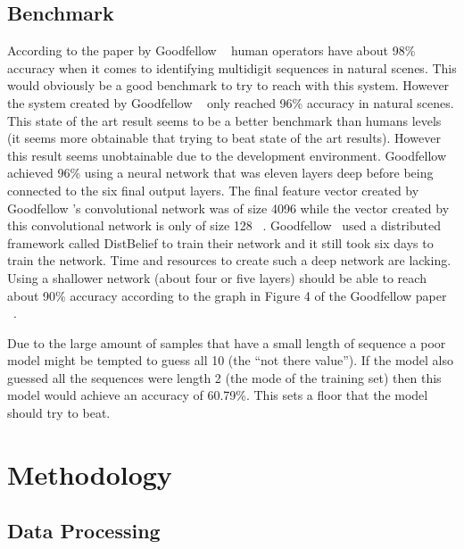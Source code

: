\documentclass[12pt,twocolumn,letterpaper]{article}
\begin{document}
\subsection{Benchmark}
According to the paper by Goodfellow \etal ~\cite{goodfellow} human operators have about 98\% 
accuracy when it comes to identifying multidigit sequences in natural scenes. 
This would obviously be a good benchmark to try to reach with this system. 
However the system created by Goodfellow \etal ~\cite{goodfellow} only reached 96\% accuracy in natural scenes. 
This state of the art result seems to be a better benchmark than humans levels 
(it seems more obtainable that trying to beat state of the art results). However
this result seems unobtainable due to the development environment. Goodfellow 
\etal ~\cite{goodfellow} achieved 96\% using a neural network that was eleven layers deep before 
being connected to the six final output layers. The final feature vector created by
Goodfellow \etal's convolutional network was of size 4096 while the vector created 
by this convolutional network is only of size 128 ~\cite{goodfellow}. Goodfellow \etal ~\cite{goodfellow}used a 
distributed framework called DistBelief to train their network and it still took 
six days to train the network. Time and resources to create such a deep network 
are lacking. Using a shallower network (about four or five layers) should be able to
reach about 90\% accuracy according to the graph in Figure 4 of the Goodfellow 
\etal paper ~\cite{goodfellow}. 

Due to the large amount of samples that have a small length of sequence a poor model 
might be tempted to guess all 10 (the ``not there value''). If the model also 
guessed all the sequences were length 2 (the mode of the training set) then this 
model would achieve an accuracy of 60.79\%. This sets a floor that the model 
should try to beat.

\section{Methodology}
\subsection{Data Processing}
\end{document}
